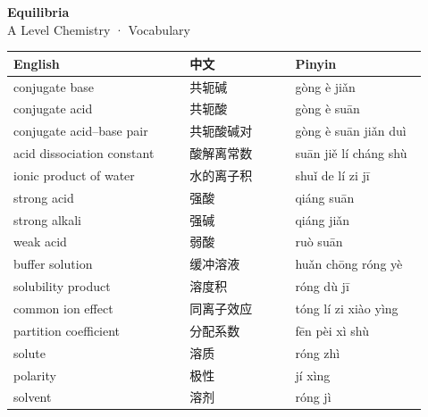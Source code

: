 \documentclass[11pt]{article}
\begin{document}
\begin{center}
  {\LARGE\bfseries Equilibria}\\[0.35em]
  {\large A Level Chemistry · Vocabulary}
\end{center}
\vspace{0.6em}

\begin{longtable}{@{}p{0.40\linewidth}p{0.24\linewidth}p{0.30\linewidth}@{}}
\toprule
\textbf{English} & \textbf{中文} & \textbf{Pinyin} \\
\midrule
\endhead
\bottomrule
\endlastfoot
conjugate base & 共轭碱 & gòng è jiǎn \\
conjugate acid & 共轭酸 & gòng è suān \\
conjugate acid–base pair & 共轭酸碱对 & gòng è suān jiǎn duì \\
acid dissociation constant & 酸解离常数 & suān jiě lí cháng shù \\
ionic product of water & 水的离子积 & shuǐ de lí zi jī \\
strong acid & 强酸 & qiáng suān \\
strong alkali & 强碱 & qiáng jiǎn \\
weak acid & 弱酸 & ruò suān \\
buffer solution & 缓冲溶液 & huǎn chōng róng yè \\
solubility product & 溶度积 & róng dù jī \\
common ion effect & 同离子效应 & tóng lí zi xiào yìng \\
partition coefficient & 分配系数 & fēn pèi xì shù \\
solute & 溶质 & róng zhì \\
polarity & 极性 & jí xìng \\
solvent & 溶剂 & róng jì \\
\end{longtable}
\end{document}
